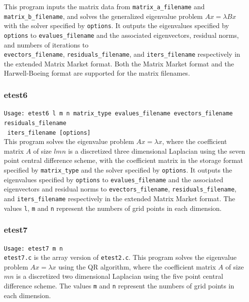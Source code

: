 \documentclass[a4paper]{article}
\begin{document}
This program inputs the matrix data from {\tt matrix\_a\_filename} and
{\tt matrix\_b\_filename}, and solves the generalized eigenvalue problem
$Ax=\lambda Bx$ with the solver specified by {\tt options}. 
It outputs the eigenvalues specified by {\tt options} to 
{\tt evalues\_filename} and the associated 
eigenvectors, residual norms, and numbers of iterations  
to \\ {\tt evectors\_filename}, {\tt residuals\_filename}, 
and {\tt iters\_filename} respectively in the extended 
Matrix Market format.  
Both the Matrix Market format and the Harwell-Boeing format are
supported for the matrix filenames. 

\subsubsection{etest6}

\verb+Usage: etest6 l m n matrix_type evalues_filename evectors_filename residuals_filename +\\
\verb+ iters_filename [options] +\\

This program solves the eigenvalue problem $Ax = \lambda x$, where the 
coefficient matrix $A$ of size $lmn$ is a discretized three dimensional Laplacian using the seven
point central difference scheme, with the coefficient matrix in the storage format specified
by \verb|matrix_type| and the solver specified by {\tt options}. 
It outputs the eigenvalues specified by {\tt options} to 
{\tt evalues\_filename} and the associated 
eigenvectors and residual norms to {\tt evectors\_filename},  
{\tt residuals\_filename}, and {\tt iters\_filename} respectively 
in the extended Matrix Market format.
The values {\tt l}, {\tt m} and {\tt n} represent the numbers of grid
points in each dimension.

\subsubsection{etest7}

\verb+Usage: etest7 m n+\\

{\tt etest7.c} is the array version of {\tt etest2.c}.
This program solves the eigenvalue problem $Ax = \lambda x$ using
the QR algorithm, where the 
coefficient matrix $A$ of size $mn$ is a discretized two dimensional Laplacian using the five
point central difference scheme. 
The values {\tt m} and {\tt n} represent the numbers of grid points
in each dimension. 
\end{document}
